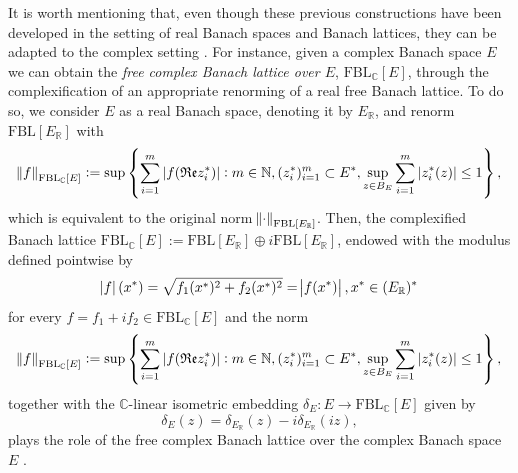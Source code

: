 \documentclass[12pt,leqno]{amsart}
\numberwithin{equation}{section} %
\theoremstyle{definition}
\numberwithin{equation}{section}
\newcommand{\N}{\mathbb{N}}
\newcommand{\R}{\mathbb{R}}
\newcommand{\C}{\mathbb{C}}
\newcommand{\fbl}{\mathrm{FBL}}
\newcommand{\nFBL}[2]{\norm{#1}_{\mathrm{FBL}[#2]}}
\begin{document}
It is worth mentioning that, even though these previous constructions have been developed in the setting of real Banach spaces and Banach lattices, they can be adapted to the complex setting \cite{dHT}. For instance, given a complex Banach space $E$ we can obtain the \textit{free complex Banach lattice over $E$}, $\fbl_{\C}[E]$, through the complexification of an appropriate renorming of a real free Banach lattice. To do so, we consider $E$ as a real Banach space, denoting it by $E_{\R}$, and renorm $\fbl[E_{\R}]$ with
\begin{equation*}
	\norm{f}_{\fbl_{\C}[E]}:=\sup \cbr{\sum_{i=1}^m \abs[0]{f(\mathfrak{Re} z_i^*)}:m\in \N, (z_i^*)_{i=1}^m\subset E^*, \sup_{z\in B_E} \sum_{i=1}^m \abs[0]{z_i^*(z)}\leq 1},
\end{equation*}
which is equivalent to the original norm $\nFBL{\cdot}{E_{\R}}$. Then, the complexified Banach lattice $\fbl_{\C}[E]:=\fbl[E_{\R}]\oplus i\fbl[E_{\R}]$, endowed with the modulus defined pointwise by
\begin{equation*}
    \abs{f}(x^*)=\sqrt{f_1(x^*)^2+f_2(x^*)^2}=\abs{f(x^*)},  x^*\in (E_{\R})^*
\end{equation*}
for every $f=f_1+if_2\in \fbl_{\C}[E]$ and the norm
\begin{equation*}
	\norm{f}_{\fbl_{\C}[E]}:=\sup \cbr{\sum_{i=1}^m \abs[0]{f(\mathfrak{Re} z_i^*)}:m\in \N, (z_i^*)_{i=1}^m\subset E^*, \sup_{z\in B_E} \sum_{i=1}^m \abs[0]{z_i^*(z)}\leq 1},
\end{equation*}
together with the $\C$-linear isometric embedding $\delta_E:E\rightarrow \fbl_{\C}[E]$ given by
$$ \delta_E (z)= \delta_{E_{\R}}(z)-i\delta_{E_{\R}}(iz), $$
plays the role of the free complex Banach lattice over the complex Banach space $E$ \cite[Theorem 3.3]{dHT}.\\
\end{document}
